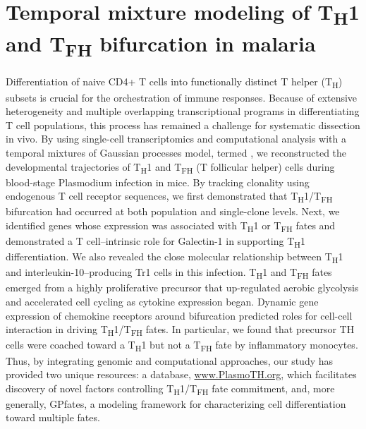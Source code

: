 
\chapter{Temporal mixture modeling of \texorpdfstring{T\textsubscript{H}\textnormal{1} and T\textsubscript{FH}}{TH1 and TFH} bifurcation in malaria}

\graphicspath{{Chapter4/Figs/}}

Differentiation of na{i}ve CD4+ T cells into functionally distinct T helper (T\textsubscript{H}) subsets is crucial for the orchestration of immune responses. Because of extensive heterogeneity and multiple overlapping transcriptional programs in differentiating T cell populations, this process has remained a challenge for systematic dissection in vivo. By using single-cell transcriptomics and computational analysis with a temporal mixtures of Gaussian processes model, termed , we reconstructed the developmental trajectories of T\textsubscript{H}1 and T\textsubscript{FH} (T follicular helper) cells during blood-stage Plasmodium infection in mice. By tracking clonality using endogenous T cell receptor sequences, we first demonstrated that T\textsubscript{H}1/T\textsubscript{FH} bifurcation had occurred at both population and single-clone levels. Next, we identified genes whose expression was associated with T\textsubscript{H}1 or T\textsubscript{FH} fates and demonstrated a T cell–intrinsic role for Galectin-1 in supporting T\textsubscript{H}1 differentiation. We also revealed the close molecular relationship between T\textsubscript{H}1 and interleukin-10–producing Tr1 cells in this infection. T\textsubscript{H}1 and T\textsubscript{FH} fates emerged from a highly proliferative precursor that up-regulated aerobic glycolysis and accelerated cell cycling as cytokine expression began. Dynamic gene expression of chemokine receptors around bifurcation predicted roles for cell-cell interaction in driving T\textsubscript{H}1/T\textsubscript{FH} fates. In particular, we found that precursor TH cells were coached toward a T\textsubscript{H}1 but not a T\textsubscript{FH} fate by inflammatory monocytes. Thus, by integrating genomic and computational approaches, our study has provided two unique resources: a database, \url{www.PlasmoTH.org}, which facilitates discovery of novel factors controlling T\textsubscript{H}1/T\textsubscript{FH} fate commitment, and, more generally, GPfates, a modeling framework for characterizing cell differentiation toward multiple fates.

